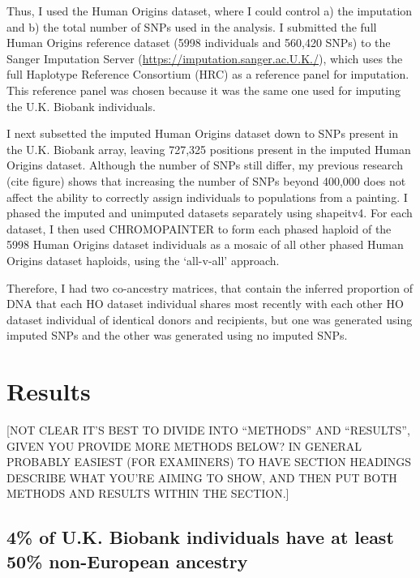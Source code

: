 Thus, I used the Human Origins dataset, where I could control a) the imputation and b) the total number of SNPs used in the analysis. I submitted the full Human Origins reference dataset (5998 individuals and 560,420 SNPs) to the Sanger Imputation Server (\url{https://imputation.sanger.ac.U.K./}), which uses the full Haplotype Reference Consortium (HRC) as a reference panel for imputation. This reference panel was chosen because it was the same one used for imputing the U.K. Biobank individuals.

I next subsetted the imputed Human Origins dataset down to SNPs present in the U.K. Biobank array, leaving 727,325 positions present in the imputed Human Origins dataset. Although the number of SNPs still differ, my previous research (cite figure) shows that increasing the number of SNPs beyond 400,000 does not affect the ability to correctly assign individuals to populations from a painting. I phased the imputed and unimputed datasets separately using shapeitv4. For each dataset, I then used CHROMOPAINTER to form each phased haploid of the 5998 Human Origins dataset individuals as a mosaic of all other phased Human Origins dataset haploids, using the `all-v-all' approach. 

Therefore, I had two co-ancestry matrices, that contain the inferred proportion of DNA that each HO dataset individual shares most recently with each other HO dataset individual of identical donors and recipients, but one was generated using imputed SNPs and the other was generated using no imputed SNPs. 


\section{Results}

{\color{red}[NOT CLEAR IT'S BEST TO DIVIDE INTO ``METHODS'' AND ``RESULTS'', GIVEN YOU PROVIDE MORE METHODS BELOW? IN GENERAL PROBABLY EASIEST (FOR EXAMINERS) TO HAVE SECTION HEADINGS DESCRIBE WHAT YOU'RE AIMING TO SHOW, AND THEN PUT BOTH METHODS AND RESULTS WITHIN THE SECTION.]}

\subsection{4\% of U.K. Biobank individuals have at least 50\% non-European ancestry}


